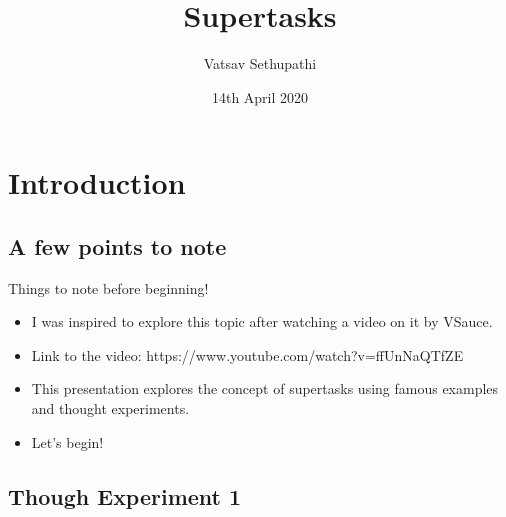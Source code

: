 \documentclass{beamer}
\title[Your Short Title]{Supertasks}
\author{Vatsav Sethupathi}
\institute{University of Arizona}
\date{14th April 2020}
\begin{document}
\begin{frame}
  \titlepage
\end{frame}


\section{Introduction}

\subsection{A few points to note}

\begin{frame}{Things to note before beginning!}

\begin{itemize}
  \item I was inspired to explore this topic after watching a video on it by VSauce.
  \item Link to the video: https://www.youtube.com/watch?v=ffUnNaQTfZE
  \item This presentation explores the concept of supertasks using famous examples and thought experiments. 
  \item Let's begin!
\end{itemize}

\end{frame}



\subsection{Though Experiment 1}
\end{document}
